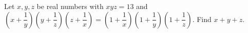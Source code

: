 Let $x,y,z$ be real numbers with $xyz=13$ and $(x+\dfrac{1}{y})(y+\dfrac{1}{z})(z+\dfrac{1}{x})=(1+\dfrac{1}{x})(1+\dfrac{1}{y})(1+\dfrac{1}{z})$. Find $x+y+z$.
